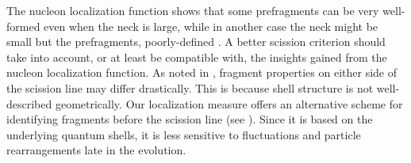The nucleon localization function shows that some prefragments can be very well-formed even when the neck is large, while in another case the neck might be small but the prefragments, poorly-defined \cite{Sadhukhan2017}. A better scission criterion should take into account, or at least be compatible with, the insights gained from the nucleon localization function. As noted in \cite{Younes2009}, fragment properties on either side of the scission line may differ drastically. This is because shell structure is not well-described geometrically. Our localization measure offers an alternative scheme for identifying fragments before the scission line (see \cite{Sadhukhan2017}). Since it is based on the underlying quantum shells, it is less sensitive to fluctuations and particle rearrangements late in the evolution.
